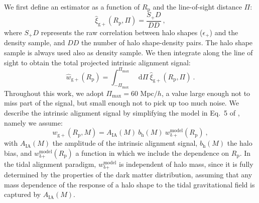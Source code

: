 \documentclass[a4paper,fleqn,usenatbib]{mnras}
\newcommand*\dif{\mathop{}\!\mathrm{d}} 	%
\begin{document}
We first define an estimator as a function of $R_{\mathrm{p}}$ and the line-of-sight distance $\Pi$:
\begin{equation}
    \hat{\xi}_{\mathrm{g+}}(R_{\mathrm{p}}, \Pi) = \frac{S_+ D}{D D} \ ,
	\label{eq:xigphat}
\end{equation}
where $S_+ D$ represents the raw correlation between halo shapes ($\epsilon_{+}$) and the density sample, and $D D$ the number of halo shape-density pairs. The halo shape sample is always used also as density sample. We then integrate along the line of sight to obtain the total projected intrinsic alignment signal:
\begin{equation}
   \hat{w}_{\mathrm{g+}} (R_{\mathrm{p}}) = \int _{-\Pi_{\mathrm{max}}}^{\Pi_{\mathrm{max}}} \dif \Pi \ \hat{\xi}_{\mathrm{g+}}(R_{\mathrm{p}}, \Pi) \ .
	\label{eq:wgphat}
\end{equation}
Throughout this work, we adopt $\Pi_{\mathrm{max}} = 60 $ Mpc$/h$, a value large enough not to miss part of the signal, but small enough not to pick up too much noise. 
We describe the intrinsic alignment signal by simplifying the model in Eq.~5 of \citet{vanUitertJoachimi2017}, namely we assume:
\begin{equation}
    w_{\mathrm{g+}} (R_{\mathrm{p}}, M)=A_{\mathrm{IA}} (M) \ b_{\mathrm{h}} (M)\ w_{\mathrm{\delta +}}^{\mathrm{model}} (R_{\mathrm{p}}) \ , 
	\label{eq:wgp}
\end{equation}
with $A_{\mathrm{IA}} (M)$ the amplitude of the intrinsic alignment signal, $b_\mathrm{h} (M)$ the halo bias, and $w_{\mathrm{\delta} \mathrm{+}}^{\mathrm{model}} (R_{\mathrm{p}})$ a function in which we include the dependence on $R_{\mathrm{p}}$. In the tidal alignment paradigm, $w_{\mathrm{\delta} \mathrm{+}}^{\mathrm{model}}$ is independent of halo mass, since it is fully determined by the properties of the dark matter distribution, assuming that any mass dependence of the response of a halo shape to the tidal gravitational field is captured by $A_{\mathrm{IA}}(M)$. 
\end{document}
